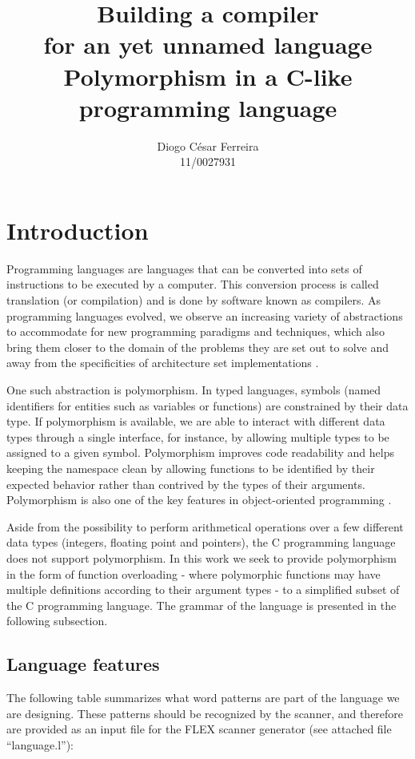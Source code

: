 \documentclass[12pt]{article}
\begin{document}
\title{Building a compiler\\\Large for an yet unnamed language\\\small Polymorphism in a C-like programming language}

\author{Diogo César Ferreira\\11/0027931}
\maketitle

\section{Introduction}
Programming languages are languages that can be converted into sets of instructions to be
executed by a computer. This conversion process is called translation (or compilation) and
is done by software known as compilers. As programming languages evolved, we observe an
increasing variety of abstractions to accommodate for new programming paradigms and
techniques, which also bring them closer to the domain of the problems they are set
out to solve and away from the specificities of architecture set implementations \cite{Aho2007}.

One such abstraction is polymorphism. In typed languages, symbols (named identifiers
for entities such as variables or functions) are constrained by their data type.
If polymorphism is available, we are able to interact with different data types
through a single interface, for instance, by allowing multiple types to be assigned
to a given symbol. Polymorphism improves code readability and helps keeping the namespace
clean by allowing functions to be identified by their expected behavior rather than
contrived by the types of their arguments. Polymorphism is also one of the key features
in object-oriented programming \cite{Aho2007, Strachey2000}.

Aside from the possibility to perform arithmetical operations over a few different
data types (integers, floating point and pointers), the C programming language does
not support polymorphism. In this work we seek to provide polymorphism in the form
of function overloading - where polymorphic functions may have multiple definitions
according to their argument types - to a simplified subset of the C programming language.
The grammar of the language is presented in the following subsection.


\subsection{Language features}
The following table summarizes what word patterns are part of the language we are designing.
These patterns should be recognized by the scanner, and therefore are provided as an input file
for the FLEX \cite{FLEX} scanner generator (see attached file ``language.l''):
\end{document}

